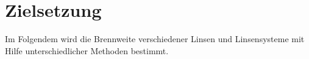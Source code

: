 \section{Zielsetzung}
\label{sec:Zielsetzung}
Im Folgendem wird die Brennweite verschiedener Linsen und Linsensysteme mit Hilfe unterschiedlicher Methoden bestimmt.
